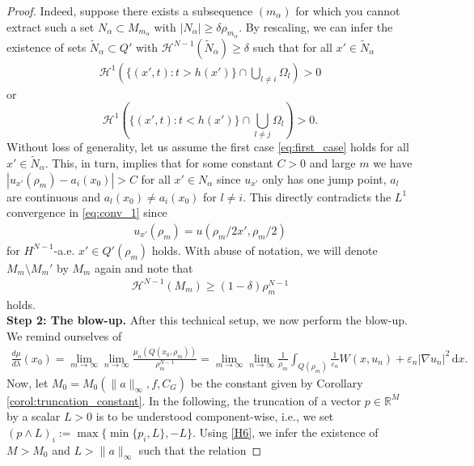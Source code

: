 \documentclass[a4paper, 11pt, reqno]{amsart}
\theoremstyle{plain}
\theoremstyle{definition}
\theoremstyle{remark}
\newcommand{\R}{\mathbb R}
\newcommand{\eps}{\varepsilon}
\renewcommand{\H}{\mathcal H}
\begin{document}
\begin{proof}
    Indeed, suppose there exists a subsequence $(m_\alpha)$ for which you cannot extract such a set $N_\alpha \subset M_{m_\alpha}$ with $|N_\alpha|  \geq \delta \rho_{m_\alpha}$. By rescaling, we can infer the existence of sets $\tilde N_\alpha \subset Q'$ with $\H^{N-1}(\tilde N_\alpha) \geq \delta$ such that for all $x' \in \tilde N_\alpha$
    \begin{align}\label{eq:first_case}
        \H^1\left( \{ (x', t): t > h(x') \} \cap \bigcup_{l \neq i} \Omega_l \right) > 0
    \end{align}
    or 
    \[
        \H^1\left( \{ (x', t): t < h(x') \} \cap \bigcup_{l \neq j} \Omega_l \right) > 0.
    \]
    Without loss of generality, let us assume the first case \eqref{eq:first_case} holds for all $x' \in \tilde N_\alpha$. This, in turn, implies that for some constant $C > 0$ and large $m$ we have $|u_{x'}(\rho_m) - a_i(x_0)| > C$ for all $x' \in N_\alpha$ since $u_{x'}$ only has one jump point, $a_l$ are continuous and $a_l(x_0) \neq a_i(x_0)$ for $l \neq i$. This directly contradicts the $L^1$ convergence in \eqref{eq:conv_1} since 
    \begin{align*}
        u_{x'}(\rho_m) = u(\rho_m/2 x', \rho_m/2) 
    \end{align*}
    for $H^{N-1}$-a.e. $x' \in Q'(\rho_m)$ holds. With abuse of notation, we will denote $M_m\setminus M_m'$ by $M_m$ again and note that
    \begin{align}\label{eq:relative_large_good_set}
        \H^{N-1}(M_m) \geq \left(1 - \delta \right)\rho_m^{N-1}
    \end{align}
    holds. \\[0.5em]
    \textbf{Step 2: The blow-up.} After this technical setup, we now perform the blow-up. We remind ourselves of
    \begin{align}\label{eq:blow_up_property}
        \frac{d\mu}{d\lambda}(x_0) = \lim_{m \to \infty} \lim_{n \to \infty} \frac{\mu_n(Q(x_0, \rho_m))}{\rho_m^{N-1}} =  \lim_{m \to \infty} \lim_{n \to \infty} \frac{1}{\rho_m }\int_{Q(\rho_m)} \frac{1}{\eps_n}W(x, u_n) + \eps_n |\nabla u_n|^2 \, \mathrm{d}x.
    \end{align}
    Now, let $M_0 = M_0(\|a\|_\infty, f, C_G)$ be the constant given by Corollary \ref{corol:truncation_constant}. In the following, the truncation of a vector $p \in \R^M$ by a scalar $L > 0$ is to be understood component-wise, i.e., we set $(p \land L)_i := \max\{ \min\{ p_i, L \}, - L \} $. Using \ref{H6}, we infer the existence of $M > M_0$ and $L > \| a\|_\infty$ such that the relation 

\end{proof}
\end{document}
